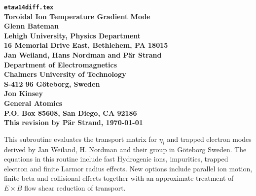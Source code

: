 \headheight 0pt \headsep 0pt          
\topmargin 0pt  \textheight 9.0in
\oddsidemargin 0pt \textwidth 6.5in

\newcommand{\Partial}[2]{\frac{\partial #1}{\partial #2}}
\newcommand{\jacobian}{{\cal J}}



\begin{center} 
{\bf {\tt etaw14diff.tex} \\
Toroidal Ion Temperature Gradient Mode  \\
\vspace{1pc}
Glenn Bateman \\
Lehigh University, Physics Department \\
16 Memorial Drive East, Bethlehem, PA 18015 \\
\vspace{1pc}
Jan Weiland, Hans Nordman and P{\"a}r Strand\\
Department of Electromagnetics \\
Chalmers University of Technology \\
S-412 96 G\"{o}teborg, Sweden \\
\vspace{1pc}
Jon Kinsey \\
General Atomics \\
P.O. Box 85608, San Diego, CA 92186} \\ 
\vspace{1pc}
{\bf This revision by P{\"a}r Strand, \today} 
\date{}
\end{center}
This subroutine evaluates the transport matrix for $\eta_i$ and trapped 
electron modes derived by Jan Weiland, H. Nordman and their group in 
G\"{o}teborg Sweden.
The equations in this routine include fast Hydrogenic ions, impurities, 
trapped electron and finite Larmor radius effects. New options include 
parallel ion motion, finite beta and collisional effects together with an 
approximate treatment of $E\times B$ flow shear reduction of transport.

